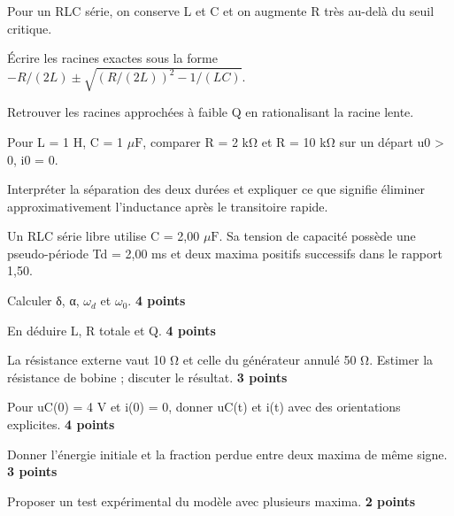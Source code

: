 \label{ch05-ex-D3}
Pour un RLC série, on conserve L et C et on augmente R très au-delà du seuil critique.\begin{questions}
\item Écrire les racines exactes sous la forme $-R/(2L)\pm\sqrt{(R/(2L))^2-1/(LC)}$.
\item Retrouver les racines approchées à faible Q en rationalisant la racine lente.
\item Pour L = 1 H, C = 1 $\mu\mathrm{ F}$, comparer R = 2 kΩ et R = 10 kΩ sur un départ u0 > 0, i0 = 0.
\item Interpréter la séparation des deux durées et expliquer ce que signifie éliminer approximativement l’inductance après le transitoire rapide.
\end{questions}


Un RLC série libre utilise C = 2,00 $\mu\mathrm{ F}$. Sa tension de capacité possède une pseudo-période Td = 2,00 ms et deux maxima positifs successifs dans le rapport 1,50.\begin{questions}
\item Calculer δ, α, $\omega_d$ et $\omega_0$. \textbf{4 points}
\item En déduire L, R totale et Q. \textbf{4 points}
\item La résistance externe vaut 10 Ω et celle du générateur annulé 50 Ω. Estimer la résistance de bobine ; discuter le résultat. \textbf{3 points}
\item Pour uC(0) = 4 V et i(0) = 0, donner uC(t) et i(t) avec des orientations explicites. \textbf{4 points}
\item Donner l’énergie initiale et la fraction perdue entre deux maxima de même signe. \textbf{3 points}
\item Proposer un test expérimental du modèle avec plusieurs maxima. \textbf{2 points}
\end{questions}



